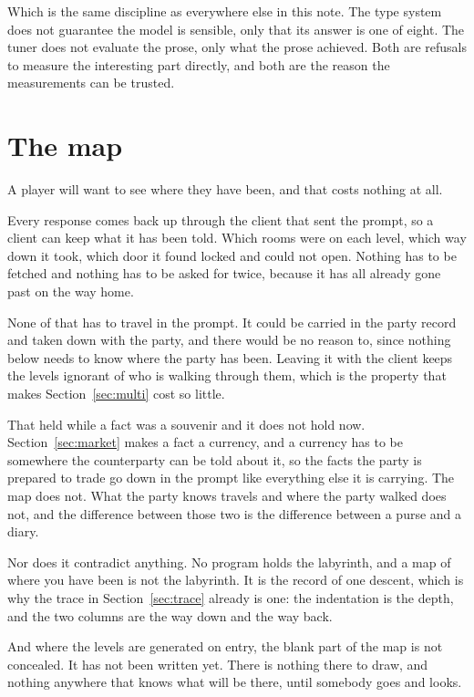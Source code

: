 \documentclass[11pt,a4paper]{article}
\begin{document}
\begin{sectionbox}
Which is the same discipline as everywhere else in this note. The type system does not guarantee
the model is sensible, only that its answer is one of eight. The tuner does not evaluate the prose,
only what the prose achieved. Both are refusals to measure the interesting part directly, and both
are the reason the measurements can be trusted.
\end{sectionbox}


\section{The map}
\label{sec:map}

A player will want to see where they have been, and that costs nothing at all.

Every response comes back up through the client that sent the prompt, so a client can keep what
it has been told. Which rooms were on each level, which way down it took, which door it found
locked and could not open. Nothing has to be fetched and nothing has to be asked for twice,
because it has all already gone past on the way home.

None of that has to travel in the prompt. It could be carried in the party record and taken down
with the party, and there would be no reason to, since nothing below needs to know where the
party has been. Leaving it with the client keeps the levels ignorant of who is walking through
them, which is the property that makes Section~\ref{sec:multi} cost so little.

\begin{alarmbox}
That held while a fact was a souvenir and it does not hold now. Section~\ref{sec:market} makes a
fact a currency, and a currency has to be somewhere the counterparty can be told about it, so the
facts the party is prepared to trade go down in the prompt like everything else it is carrying.
The map does not. What the party knows travels and where the party walked does not, and the
difference between those two is the difference between a purse and a diary.
\end{alarmbox}

Nor does it contradict anything. No program holds the labyrinth, and a map of where you have been
is not the labyrinth. It is the record of one descent, which is why the trace in
Section~\ref{sec:trace} already is one: the indentation is the depth, and the two columns are the
way down and the way back.

\begin{sectionbox}
And where the levels are generated on entry, the blank part of the map is not concealed. It has
not been written yet. There is nothing there to draw, and nothing anywhere that knows what will
be there, until somebody goes and looks.
\end{sectionbox}
\end{document}
